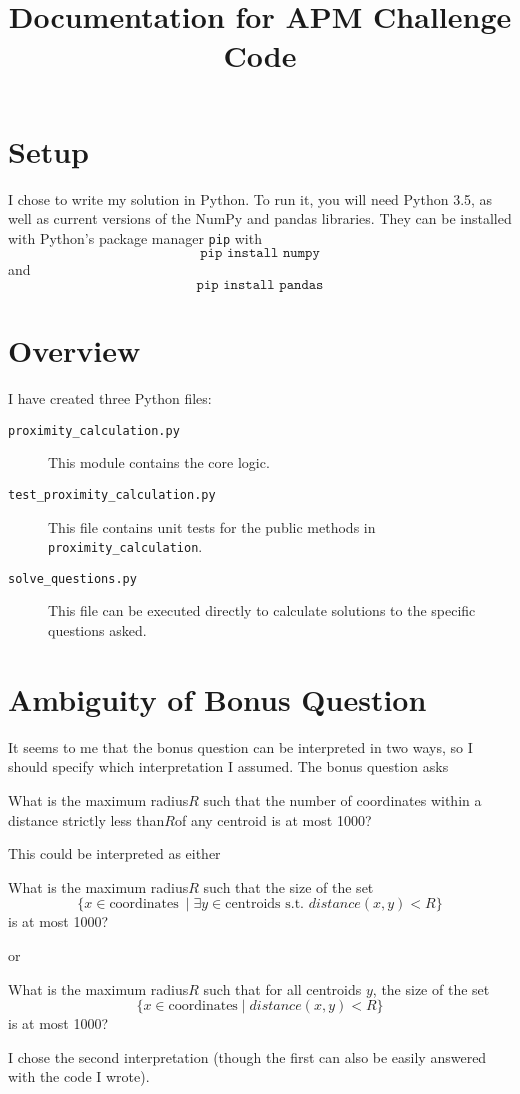 \documentclass{amsart}
\theoremstyle{definition}
\theoremstyle{definition}
\begin{document}
\title[Documentation for APM Challenge Code]{Documentation for APM Challenge Code}

\date{}

\maketitle

\section{Setup}
I chose to write my solution in Python.  To run it, you will need Python 3.5, as well as current versions of the NumPy and pandas libraries.  They can be installed with Python's package manager \texttt{pip} with
\[
\texttt{pip install numpy}
\]
and
\[
\texttt{pip install pandas}
\]

\section{Overview}
I have created three Python files:
\begin{description}
\item[\texttt{proximity\_calculation.py}] This module contains the core logic.
\item[\texttt{test\_proximity\_calculation.py}] This file contains unit tests for the public methods in \texttt{proximity\_calculation}.
\item[\texttt{solve\_questions.py}] This file can be executed directly to calculate solutions to the specific questions asked.
\end{description}

\section{Ambiguity of Bonus Question}
It seems to me that the bonus question can be interpreted in two ways, so I should specify which interpretation I assumed.  The bonus question asks
\begin{displayquote}
  What is the maximum radius ​$R$ such that the number of coordinates within a distance strictly less than ​$R$ ​of any centroid is at most 1000?
\end{displayquote}
This could be interpreted as either
\begin{displayquote}
  What is the maximum radius ​$R$ such that the size of the set
  \[
  \{x \in \mbox{coordinates}\ \mid \exists y \in \mbox{centroids s.t. } distance(x, y) < R\}
  \]
  is at most 1000?
\end{displayquote}
or
\begin{displayquote}
  What is the maximum radius ​$R$ such that for all centroids $y$, the size of the set
  \[
  \{x \in \mbox{coordinates} \mid distance(x, y) < R\}
  \]
  is at most 1000?
\end{displayquote}
I chose the second interpretation (though the first can also be easily answered with the code I wrote).
\end{document}
